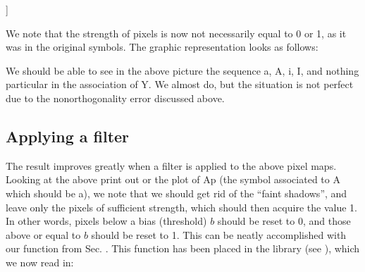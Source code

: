 \documentclass[letterpaper,10pt,english]{jupyterBook}
\begin{document}
\begin{sphinxVerbatim}[commandchars=\\\{\}]
[[0.   0.   0.   0.   0.   0.   0.   0.   0.   0.   0.   0.  ]
 [0.   0.   0.   0.   0.25 0.85 0.25 0.   0.   0.   0.   0.  ]
 [0.   0.   0.   0.   0.   0.85 0.   0.   0.   0.   0.   0.  ]
 [0.   0.   0.   1.   1.6  1.85 1.89 0.   0.   0.   0.   0.  ]
 [0.   0.   1.   0.   0.6  0.25 1.6  0.   0.   0.   0.   0.  ]
 [0.   0.   1.   0.6  0.   0.54 1.29 0.6  0.   0.   0.   0.  ]
 [0.   0.   1.   0.6  0.   0.25 1.29 0.6  0.   0.   0.   0.  ]
 [0.   0.   0.6  1.6  1.6  1.85 1.89 1.6  0.6  0.   0.   0.  ]
 [0.   0.   0.6  0.   0.   0.25 0.29 0.   0.6  0.   0.   0.  ]
 [0.   0.6  0.   0.   0.   0.25 0.   0.29 0.29 0.6  0.   0.  ]
 [0.   0.6  0.   0.   0.25 0.25 0.25 0.   0.   0.6  0.   0.  ]
 [0.   0.   0.   0.   0.   0.   0.   0.   0.   0.   0.   0.  ]]
\end{sphinxVerbatim}

\sphinxAtStartPar
We note that the strength of pixels is now not necessarily equal to 0 or 1, as it was in the original symbols. The graphic representation looks as follows:

\noindent{}

\sphinxAtStartPar
We should be able to see in the above picture the sequence a, A, i, I, and nothing particular in the association of Y. We almost do, but the situation is not perfect due to the nonorthogonality error discussed above.


\subsection{Applying a filter}
\label{\detokenize{docs/memory:applying-a-filter}}
\sphinxAtStartPar
The result improves greatly when a filter is applied to the above pixel maps. Looking at the above print out or the plot of Ap (the symbol associated to A which should be a), we note that we should get rid of the “faint shadows”, and leave only the pixels of sufficient strength, which should then acquire the value 1. In other words, pixels below a bias (threshold) \(b\) should be reset to 0, and those above or equal to \(b\) should be reset to 1. This can be neatly accomplished with our  function from Sec. {\hyperref[\detokenize{docs/mcp:mcp-p-lab}]{}}. This function has been placed in the library  (see {\hyperref[\detokenize{docs/lib_app:app-lab}]{}}), which we now read in:
\end{document}
